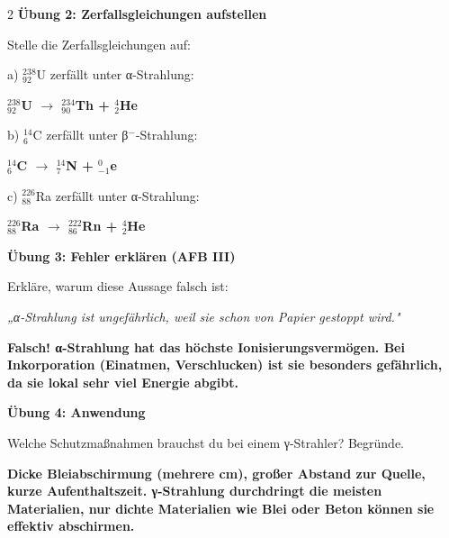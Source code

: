 \documentclass[10pt, a4paper]{article}
\newcommand{\fachfarbe}{physik}
\newcommand{\lsg}[1]{\textcolor{loesung}{\textbf{#1}}}
\newcommand{\abschnitt}[1]{%
    \vspace{8pt}\noindent\textbf{\textcolor{\fachfarbe}{#1}}\vspace{4pt}
}
\begin{document}
\begin{multicols}{2}
\abschnitt{Übung 2: Zerfallsgleichungen aufstellen}

Stelle die Zerfallsgleichungen auf:

\vspace{6pt}

a) $^{238}_{92}$U zerfällt unter α-Strahlung:

\vspace{4pt}
\lsg{$^{238}_{92}$U $\rightarrow$ $^{234}_{90}$Th + $^{4}_{2}$He}

\vspace{6pt}

b) $^{14}_{6}$C zerfällt unter β$^-$-Strahlung:

\vspace{4pt}
\lsg{$^{14}_{6}$C $\rightarrow$ $^{14}_{7}$N + $^{0}_{-1}$e}

\vspace{6pt}

c) $^{226}_{88}$Ra zerfällt unter α-Strahlung:

\vspace{4pt}
\lsg{$^{226}_{88}$Ra $\rightarrow$ $^{222}_{86}$Rn + $^{4}_{2}$He}

\vspace{8pt}


\abschnitt{Übung 3: Fehler erklären (AFB III)}

\begin{fehlerbox}
Erkläre, warum diese Aussage falsch ist:

\vspace{4pt}

\textit{„α-Strahlung ist ungefährlich, weil sie schon von Papier gestoppt wird."}

\vspace{4pt}
\lsg{Falsch! α-Strahlung hat das höchste Ionisierungsvermögen. Bei Inkorporation (Einatmen, Verschlucken) ist sie besonders gefährlich, da sie lokal sehr viel Energie abgibt.}
\end{fehlerbox}

\vspace{8pt}


\abschnitt{Übung 4: Anwendung}

Welche Schutzmaßnahmen brauchst du bei einem γ-Strahler? Begründe.

\vspace{4pt}
\lsg{Dicke Bleiabschirmung (mehrere cm), großer Abstand zur Quelle, kurze Aufenthaltszeit. γ-Strahlung durchdringt die meisten Materialien, nur dichte Materialien wie Blei oder Beton können sie effektiv abschirmen.}

\end{multicols}
\end{document}
